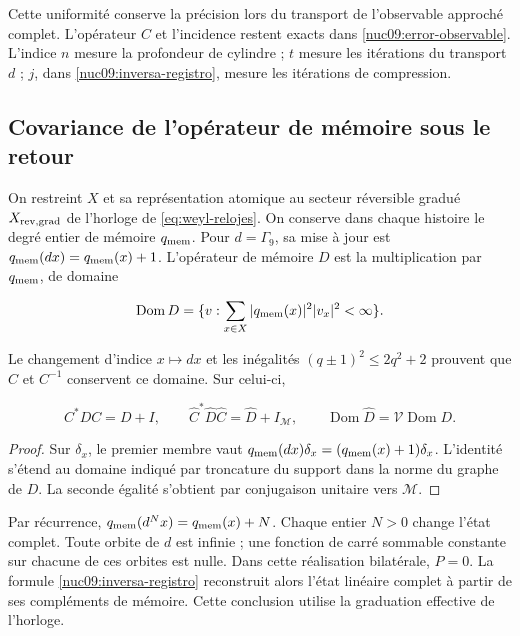 Cette uniformité conserve la précision lors du transport de l’observable
approché complet. L’opérateur \(C\) et l’incidence restent
exacts dans \eqref{nuc09:error-observable}.
L’indice \(n\) mesure la profondeur de cylindre ; \(t\) mesure les itérations
du transport \(d\) ; \(j\), dans \eqref{nuc09:inversa-registro},
mesure les itérations de compression.

\subsection{Covariance de l’opérateur de mémoire sous le retour}

On restreint \(X\) et sa représentation atomique au secteur réversible
gradué \(X_{\rm rev,grad}\) de l’horloge de
\eqref{eq:weyl-relojes}. On conserve dans chaque histoire le degré entier
de mémoire \(q_{\rm mem}\). Pour \(d=\Gamma_9\), sa mise à jour est
\(q_{\rm mem}(dx)=q_{\rm mem}(x)+1\).
L’opérateur de mémoire \(D\) est la multiplication par
\(q_{\rm mem}\), de domaine



\[
\operatorname{Dom}D=\{v:\sum_{x\in X}|q_{\rm mem}(x)|^2|v_x|^2<\infty\}.
\]



Le changement d’indice \(x\mapsto dx\) et les inégalités
\((q\pm1)^2\le2q^2+2\) prouvent que \(C\) et \(C^{-1}\)
conservent ce domaine. Sur celui-ci,




\begin{equation}
C^*DC=D+I,\qquad
\widehat C^*\widehat D\widehat C=\widehat D+I_{\mathcal M},
\qquad\operatorname{Dom}\widehat D=\mathcal V\operatorname{Dom}D.
\label{nuc09:memoria}
\end{equation}



\begin{proof}
Sur \(\delta_x\), le premier membre vaut
\(q_{\rm mem}(dx)\delta_x=(q_{\rm mem}(x)+1)\delta_x\).
L’identité s’étend au domaine indiqué par troncature du
support dans la norme du graphe de \(D\).
La seconde égalité s’obtient par conjugaison unitaire vers
\(\mathcal M\).
\end{proof}

Par récurrence,
\(q_{\rm mem}(d^Nx)=q_{\rm mem}(x)+N\).
Chaque entier \(N>0\) change l’état complet.
Toute orbite de \(d\) est infinie ; une fonction de carré sommable
constante sur chacune de ces orbites est nulle.
Dans cette réalisation bilatérale, \(P=0\).
La formule \eqref{nuc09:inversa-registro} reconstruit alors
l’état linéaire complet à partir de ses compléments de mémoire.
Cette conclusion utilise la graduation effective de l’horloge.


